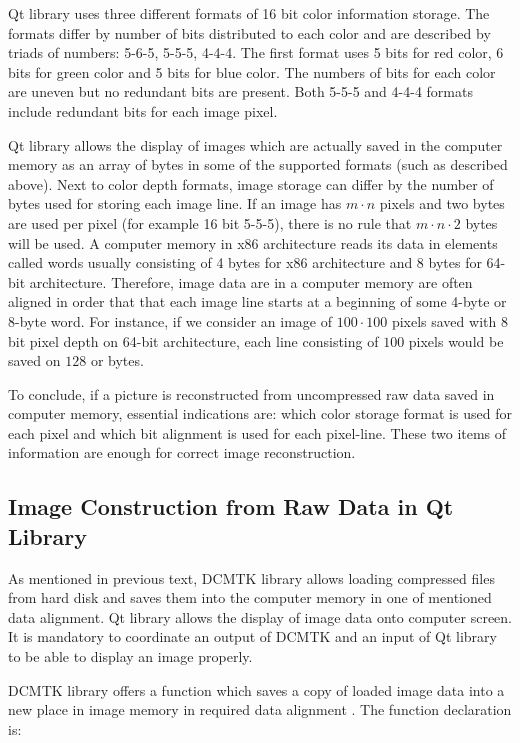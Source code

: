 Qt library uses three different formats of 16 bit color information storage. The formats differ by number of bits distributed to each color and are described by triads of numbers: 5-6-5, 5-5-5, 4-4-4. The first format uses 5 bits for red color, 6 bits for green color and 5 bits for blue color. The numbers of bits for each color are uneven but no redundant bits are present. Both 5-5-5 and 4-4-4 formats include redundant bits for each image pixel\cite[p.~37]{fileformatencyclo}.

Qt library allows the display of images which are actually saved in the computer memory as an array of bytes in some of the supported formats (such as described above). Next to color depth formats, image storage can differ by the number of bytes used for storing each image line. If an image has $m \cdot n$ pixels and two bytes are used per pixel (for example 16 bit 5-5-5), there is no rule that $m \cdot n \cdot 2$ bytes will be used. A computer memory in x86 architecture reads its data in elements called words usually consisting of 4 bytes for x86 architecture and 8 bytes for 64-bit architecture. Therefore, image data are in a computer memory are often aligned in order that that each image line starts at a beginning of some 4-byte or 8-byte word\cite{memoryalignment}. For instance, if we consider an image of $100 \cdot 100$ pixels saved with 8 bit pixel depth on 64-bit architecture, each line consisting of $100$ pixels would be saved on $128$ or bytes.

To conclude, if a picture is reconstructed from uncompressed raw data saved in computer memory, essential indications are: which color storage format is used for each pixel and which bit alignment is used for each pixel-line. These two items of information are enough for correct image reconstruction.

\subsection{Image Construction from Raw Data in Qt Library}
As mentioned in previous text, DCMTK library allows loading compressed files from hard disk and saves them into the computer memory in one of mentioned data alignment. Qt library allows the display of image data onto computer screen. It is mandatory to coordinate an output of DCMTK and an input of Qt library to be able to display an image properly.

DCMTK library offers a function which saves a copy of loaded image data into a new place in image memory in required data alignment \cite{dcmtksupport}. The function declaration is:

